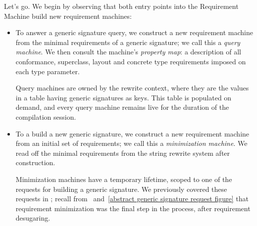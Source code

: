 \documentclass[../generics]{subfiles}
\begin{document}
Let's go. We begin by observing that both entry points into the Requirement Machine build new requirement machines:
\begin{itemize}
\item To answer a generic signature query, we construct a new requirement machine from the minimal requirements of a generic signature; we call this a \emph{query machine}. We then consult the machine's \emph{property map}: a description of all conformance, superclass, layout and concrete type requirements imposed on each type parameter.

Query machines are owned by the rewrite context, where they are the values in a table having generic signatures as keys. This table is populated on demand, and every query machine remains live for the duration of the compilation session.

\item To a build a new generic signature, we construct a new requirement machine from an initial set of requirements; we call this a \emph{minimization machine}. We read off the minimal requirements from the string rewrite system after construction.

Minimization machines have a temporary lifetime, scoped to one of the requests for building a generic signature. We previously covered these requests in ; recall from ~and~\ref{abstract generic signature request figure} that requirement minimization was the final step in the process, after requirement desugaring. 
\end{itemize}

\begin{figure}\label{rqm flowchart generic signature}
\begin{center}
\end{center}
\end{figure}
\end{document}
